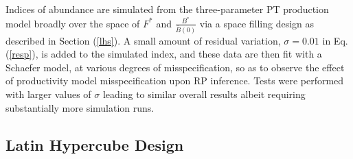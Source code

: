 %
%


%

Indices of abundance are simulated from the three-parameter PT production model
broadly over the space of $F^*$ and $\frac{B^*}{\bar B(0)}$ via a space filling
design as described in Section (\ref{lhs}). A small amount of residual variation,
$\sigma=0.01$ in Eq. (\ref{resp}), is added to the simulated index, and these data 
are then fit with a Schaefer model, at various degrees of misspecification, so 
as to observe the effect of productivity model misspecification upon RP inference.
Tests were performed with larger values of $\sigma$ leading to similar overall results 
albeit requiring substantially more simulation runs.

%
%
%
\subsection{Latin Hypercube Design \label{lhs}}

